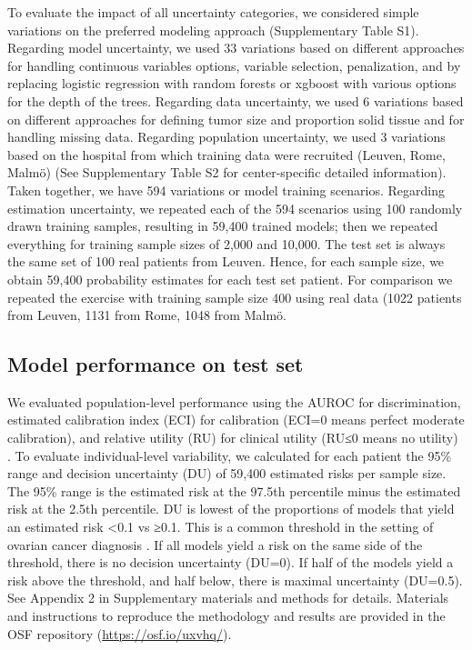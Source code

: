 To evaluate the impact of all uncertainty categories, we considered simple variations on the preferred modeling approach (Supplementary Table S1). Regarding model uncertainty, we used 33 variations based on different approaches for handling continuous variables options, variable selection, penalization, and by replacing logistic regression with random forests or xgboost with various options for the depth of the trees. Regarding data uncertainty, we used 6 variations based on different approaches for defining tumor size and proportion solid tissue and for handling missing data. Regarding population uncertainty, we used 3 variations based on the hospital from which training data were recruited (Leuven, Rome, Malmö) (See Supplementary Table S2 for center-specific detailed information). Taken together, we have 594 variations or model training scenarios. Regarding estimation uncertainty, we repeated each of the 594 scenarios using 100 randomly drawn training samples, resulting in 59,400 trained models; then we repeated everything for training sample sizes of 2,000 and 10,000. The test set is always the same set of 100 real patients from Leuven. Hence, for each sample size, we obtain 59,400 probability estimates for each test set patient. 
For comparison we repeated the exercise with training sample size 400 using real data (1022 patients from Leuven, 1131 from Rome, 1048 from Malmö. 

\subsection{Model performance on test set}
We evaluated population-level performance using the AUROC for discrimination, estimated calibration index (ECI) for calibration (ECI=0 means perfect moderate calibration), and relative utility (RU) for clinical utility (RU≤0 means no utility) \cite{vanhoordeAssessingCalibrationMultinomial2014,bakerUsingRelativeUtility2009}. To evaluate individual-level variability, we calculated for each patient the 95\% range and decision uncertainty (DU) of 59,400 estimated risks per sample size. The 95\% range is the estimated risk at the 97.5th percentile minus the estimated risk at the 2.5th percentile. DU is lowest of the proportions of models that yield an estimated risk <0.1 vs ≥0.1. This is a common threshold in the setting of ovarian cancer diagnosis \cite{timmermanESGOISUOGIOTA2021}. If all models yield a risk on the same side of the threshold, there is no decision uncertainty (DU=0). If half of the models yield a risk above the threshold, and half below, there is maximal uncertainty (DU=0.5). See Appendix 2 in Supplementary materials and methods for details. Materials and instructions to reproduce the methodology and results are provided in the OSF repository (\url{https://osf.io/uxvhq/}).

